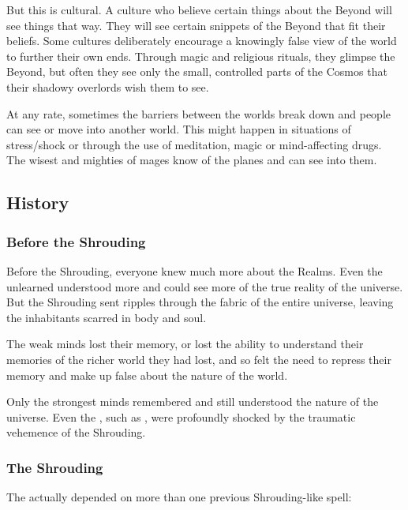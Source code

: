 But this is cultural. A culture who believe certain things about the Beyond will see things that way. They will see certain snippets of the Beyond that fit their beliefs. Some cultures deliberately encourage a knowingly false view of the world to further their own ends. Through magic and religious rituals, they glimpse the Beyond, but often they see only the small, controlled parts of the Cosmos that their shadowy overlords wish them to see. 

At any rate, sometimes the barriers between the worlds break down and people can see or move into another world. This might happen in situations of stress/shock or through the use of meditation, magic or mind-affecting drugs. The wisest and mighties of mages know of the planes and can see into them. 







\subsection{History}





\subsubsection{Before the Shrouding}
Before the Shrouding, everyone knew much more about the Realms. Even the unlearned understood more and could see more of the true reality of the universe. But the Shrouding sent ripples through the fabric of the entire universe, leaving the inhabitants scarred in body and soul. 

The weak minds lost their memory, or lost the ability to understand their memories of the richer world they had lost, and so felt the need to repress their memory and make up false  about the nature of the world. 

Only the strongest minds remembered and still understood the nature of the universe. Even the \vertices, such as \Ishna, were profoundly shocked by the traumatic vehemence of the Shrouding. 





\subsubsection{The Shrouding}
The \Shrouding{} actually depended on more than one previous Shrouding-like spell: 


